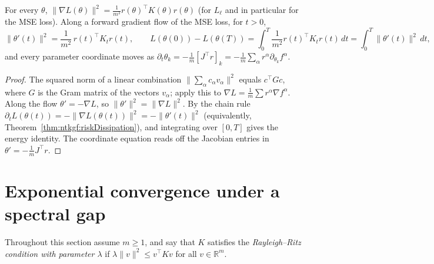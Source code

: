 \begin{theorem}\label{thm:ntkgf:kineticEnergy}
  \leanok
For every $\theta$, $\|\nabla L(\theta)\|^2=\frac1{m^2}r(\theta)^\top K(\theta)r(\theta)$ (for $L_\ell$ and in particular for the MSE loss). Along a
forward gradient flow of the MSE loss, for $t>0$,
\[
  \|\theta'(t)\|^2=\frac1{m^2}\,r(t)^\top K_tr(t),\qquad
  L(\theta(0))-L(\theta(T))=\int_0^T\frac1{m^2}r(t)^\top K_tr(t)\,dt=\int_0^T\|\theta'(t)\|^2\,dt,
\]
and every parameter coordinate moves as $\partial_t\theta_k=-\frac1m[J^\top r]_k=-\frac1m\sum_\alpha r^\alpha\partial_{\theta_k}f^\alpha$.
\end{theorem}

\begin{proof}
  \leanok
The squared norm of a linear combination $\|\sum_\alpha c_\alpha v_\alpha\|^2$ equals $c^\top Gc$, where $G$ is the Gram matrix of the vectors
$v_\alpha$; apply this to $\nabla L=\frac1m\sum r^\alpha\nabla f^\alpha$. Along the flow $\theta'=-\nabla L$, so $\|\theta'\|^2=\|\nabla L\|^2$.
By the chain rule $\partial_tL(\theta(t))=-\|\nabla L(\theta(t))\|^2=-\|\theta'(t)\|^2$ (equivalently, Theorem~\ref{thm:ntkgf:riskDissipation}), and
integrating over $[0,T]$ gives the energy identity. The coordinate equation reads off the Jacobian entries in $\theta'=-\frac1mJ^\top r$.
\end{proof}


\section{Exponential convergence under a spectral gap}\label{sec:ntkgf:convergence}

Throughout this section assume $m\ge1$, and say that $K$ satisfies the \emph{Rayleigh--Ritz condition with parameter $\lambda$} if
$\lambda\|v\|^2\le v^\top Kv$ for all $v\in\mathbb R^m$.

